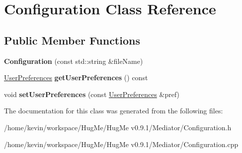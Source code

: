 \hypertarget{classConfiguration}{
\section{Configuration Class Reference}
\label{classConfiguration}
}
\subsection*{Public Member Functions}
\begin{DoxyCompactItemize}
\item 
\hypertarget{classConfiguration_ab3a2622e0fdae62c410e851036cb7a77}{
{\bfseries Configuration} (const std::string \&fileName)}
\label{classConfiguration_ab3a2622e0fdae62c410e851036cb7a77}

\item 
\hypertarget{classConfiguration_af60b6cbd2ad623fe06cf3bc274f5a292}{
\hyperlink{structUserPreferences}{UserPreferences} {\bfseries getUserPreferences} () const }
\label{classConfiguration_af60b6cbd2ad623fe06cf3bc274f5a292}

\item 
\hypertarget{classConfiguration_aee3e4e01d719504ed22ea7f0c8f0ef24}{
void {\bfseries setUserPreferences} (const \hyperlink{structUserPreferences}{UserPreferences} \&pref)}
\label{classConfiguration_aee3e4e01d719504ed22ea7f0c8f0ef24}

\end{DoxyCompactItemize}


The documentation for this class was generated from the following files:\begin{DoxyCompactItemize}
\item 
/home/kevin/workspace/HugMe/HugMe v0.9.1/Mediator/Configuration.h\item 
/home/kevin/workspace/HugMe/HugMe v0.9.1/Mediator/Configuration.cpp\end{DoxyCompactItemize}

